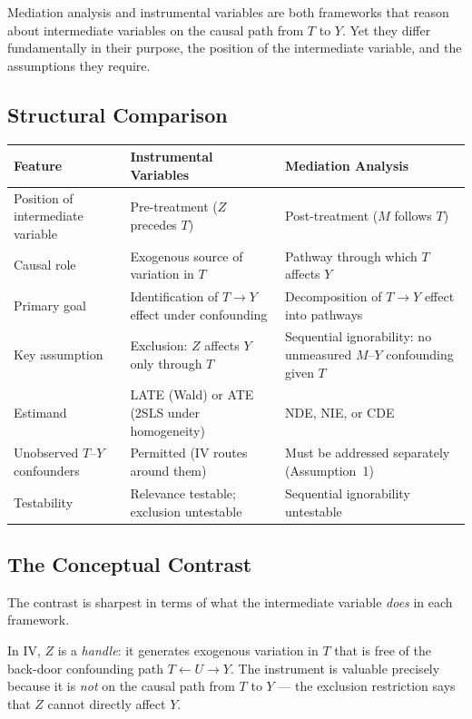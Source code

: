 \documentclass[master.tex]{subfiles}
\begin{document}
Mediation analysis and instrumental variables are both frameworks that
reason about intermediate variables on the causal path from $T$ to $Y$.
Yet they differ fundamentally in their purpose, the position of the
intermediate variable, and the assumptions they require.

\subsection{Structural Comparison}

\begin{center}
\renewcommand{\arraystretch}{1.5}
\begin{tabular}{p{3.0cm} p{4.5cm} p{4.5cm}}
\toprule
\textbf{Feature}
  & \textbf{Instrumental Variables}
  & \textbf{Mediation Analysis} \\
\midrule
Position of intermediate variable
  & Pre-treatment ($Z$ precedes $T$)
  & Post-treatment ($M$ follows $T$) \\
Causal role
  & Exogenous source of variation in $T$
  & Pathway through which $T$ affects $Y$ \\
Primary goal
  & Identification of $T \to Y$ effect under confounding
  & Decomposition of $T \to Y$ effect into pathways \\
Key assumption
  & Exclusion: $Z$ affects $Y$ only through $T$
  & Sequential ignorability: no unmeasured $M$--$Y$ confounding given $T$ \\
Estimand
  & LATE (Wald) or ATE (2SLS under homogeneity)
  & NDE, NIE, or CDE \\
Unobserved $T$--$Y$ confounders
  & Permitted (IV routes around them)
  & Must be addressed separately (Assumption~1) \\
Testability
  & Relevance testable; exclusion untestable
  & Sequential ignorability untestable \\
\bottomrule
\end{tabular}
\end{center}

\subsection{The Conceptual Contrast}

The contrast is sharpest in terms of what the intermediate variable
\emph{does} in each framework.

\medskip\noindent In IV, $Z$ is a \emph{handle}: it generates exogenous
variation in $T$ that is free of the back-door confounding path
$T \leftarrow U \rightarrow Y$.  The instrument is valuable precisely
because it is \emph{not} on the causal path from $T$ to $Y$ --- the
exclusion restriction says that $Z$ cannot directly affect $Y$.
\end{document}
